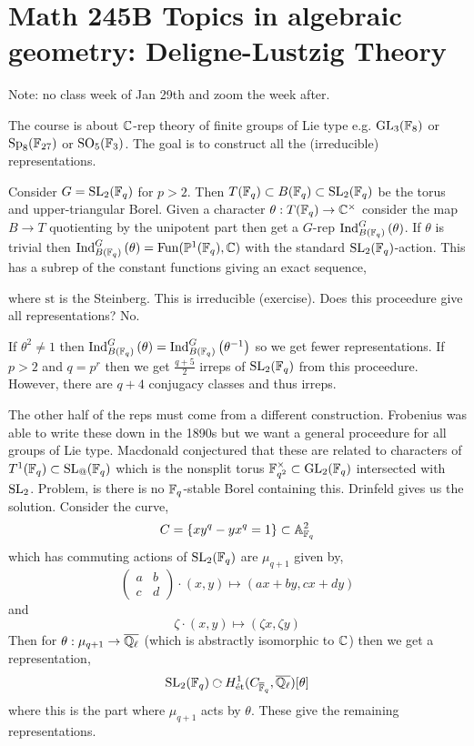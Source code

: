\documentclass[12pt]{article}
\begin{document}
\section{Math 245B Topics in algebraic geometry: Deligne-Lustzig Theory}

Note: no class week of Jan 29th and zoom the week after. 

The course is about $\mathbb{C}$-rep theory of finite groups of Lie type e.g. $\mathrm{GL}_3(\mathbb{F}_8)$ or $\mathrm{Sp}_8(\mathbb{F}_{27})$ or $\mathrm{SO}_5(\mathbb{F}_3)$. The goal is to construct all the (irreducible) representations. 

\begin{example}
Consider $G = \mathrm{SL}_2(\mathbb{F}_q)$ for $p > 2$. Then $T(\mathbb{F}_q) \subset B(\mathbb{F}_q) \subset \mathrm{SL}_2(\mathbb{F}_q)$ be the torus and upper-triangular Borel. Given a character $\theta : T(\mathbb{F}_q) \to \mathbb{C}^\times$ consider the map $B \to T$ quotienting by the unipotent part then get a $G$-rep $\mathrm{Ind}^{G}_{B(\mathbb{F}_q)} \left( \theta \right)$. If $\theta$ is trivial then $\mathrm{Ind}^{G}_{B(\mathbb{F}_q)} \left( \theta \right) = \mathrm{Fun}(\mathbb{P}^1(\mathbb{F}_q), \mathbb{C})$ with the standard $\mathrm{SL}_2(\mathbb{F}_q)$-action. This has a subrep of the constant functions giving an exact sequence,
\begin{center}
\end{center}
where $\text{st}$ is the Steinberg. This is irreducible (exercise). Does this proceedure give all representations? No. 
\end{example}

\begin{example}
If $\theta^2 \neq 1$ then $\mathrm{Ind}^{G}_{B(\mathbb{F}_q)} \left( \theta \right) = \mathrm{Ind}^{G}_{B(\mathbb{F}_q)} \left( \theta^{-1} \right)$ so we get fewer representations. If $p > 2$ and $q = p^r$ then we get $\frac{q+5}{2}$ irreps of $\mathrm{SL}_2(\mathbb{F}_q)$ from this proceedure. However, there are $q + 4$ conjugacy classes and thus irreps. 
\end{example}

The other half of the reps must come from a different construction. Frobenius was able to write these down in the 1890s but we want a general proceedure for all groups of Lie type. Macdonald conjectured that these are related to characters of $T^1(\mathbb{F}_q) \subset \mathrm{SL}_@(\mathbb{F}_q)$ which is the nonsplit torus $\mathbb{F}_{q^2}^\times \subset \mathrm{GL}_2(\mathbb{F}_q)$ intersected with $\mathrm{SL}_2$. Problem, is there is no $\mathbb{F}_q$-stable Borel containing this. Drinfeld gives us the solution. Consider the curve,
\[ C = \{ xy^q - yx^q = 1 \} \subset \mathbb{A}^2_{\mathbb{F}_q} \]
which has commuting actions of $\mathrm{SL}_2(\mathbb{F}_q)$ are $\mu_{q+1}$ given by,
\[ \begin{pmatrix}
a & b
\\
c & d
\end{pmatrix} 
\cdot (x,y) \mapsto (ax + by, cx + d y) \]
and
\[ \zeta \cdot (x,y) \mapsto (\zeta x, \zeta y) \]
Then for $\theta : \mu_{q+1} \to \overline{\mathbb{Q}_{\ell}}$ (which is abstractly isomorphic to $\mathbb{C}$) then we get a representation,
\[ \SL_2(\FF_q) \acts H^1_{\et}(C_{\overline{\FF}_q}, \overline{\Q_\ell})[\theta] \]
where this is the part where $\mu_{q+1}$ acts by $\theta$. These give the remaining representations. 
\end{document}
